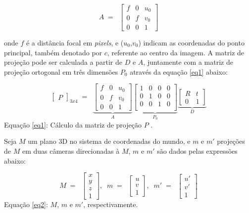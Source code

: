 \begin{equation}
A \; = \; \;
\begin{bmatrix}
		f & 0 & u_{0} \\
		0 & f & v_{0} \\
		0 & 0 & 1
\end{bmatrix}
\end{equation}

\noindent
onde $f$ é a distância focal em \textit{pixels}, e ($u_{0}$,$v_{0}$) indicam as coordenadas do ponto principal, também denotado por $c$, referente ao centro da imagem.
A matriz de projeção pode ser calculada a partir de $D$ e $A$, juntamente com a matriz de projeção ortogonal em três dimensões $P_0$ através da equação \eqref{eq1} abaixo:

\begin{equation}\label{eq1}
\begin{bmatrix}
		P
\end{bmatrix}_{3x4}	\; = \; \;
\underbrace{\begin{bmatrix}
		f & 0 & u_{0} \\
		0 & f & v_{0} \\
		0 & 0 & 1
\end{bmatrix}
}_{A}
\underbrace{\begin{bmatrix}
		1&0&0&0 \\
		0&1&0&0 \\
		0&0&1&0 \\
\end{bmatrix}}_{P_{0}}	
\underbrace{\begin{bmatrix}
		R & t \\
		0 & 1		
	\end{bmatrix}}_{D}
\end{equation}
Equação \eqref{eq1}: Cálculo da matriz de projeção $P$ \cite{Faugeras-Geometry}.

Seja $M$ um plano 3D no sistema de coordenadas do mundo, e $m$ e $m'$ projeções de $M$ em duas câmeras direcionadas à $M$, $m$ e $m'$ são dados pelas expressões abaixo:

\begin{equation}\label{eq2}
M \; = \; \;
\begin{bmatrix}
x \\ y \\ z \\ 1
\end{bmatrix}, \; \;
m \; = \; \;
\begin{bmatrix}
u \\ v \\ 1
\end{bmatrix}, \;\;
m' \; = \; \;
\begin{bmatrix}
u' \\ v' \\ 1
\end{bmatrix}
\end{equation}
Equação \eqref{eq2}: $M$, $m$ e $m'$, respectivamente.

